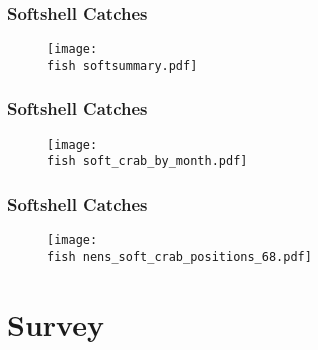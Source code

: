 \documentclass{beamer}
\begin{document}




\begin{frame}
	\frametitle{Softshell Catches}
	\begin{figure}
		
		\vspace*{-.5cm}
		\centerline{\texttt{[image: \\fish softsummary.pdf]}}
		
	\end{figure}
\end{frame}



\begin{frame}
	\frametitle{Softshell Catches}
	\begin{figure}
		
		\vspace*{-.5cm}
		\centerline{\texttt{[image: \\fish soft\_crab\_by\_month.pdf]}}
		
	\end{figure}
\end{frame}

\begin{frame}
	\frametitle{Softshell Catches}
	\begin{figure}
		
		\vspace*{-.5cm}
		\centerline{\texttt{[image: \\fish nens\_soft\_crab\_positions\_68.pdf]}}
		
	\end{figure}
\end{frame}

\section{Survey}
\end{document}
